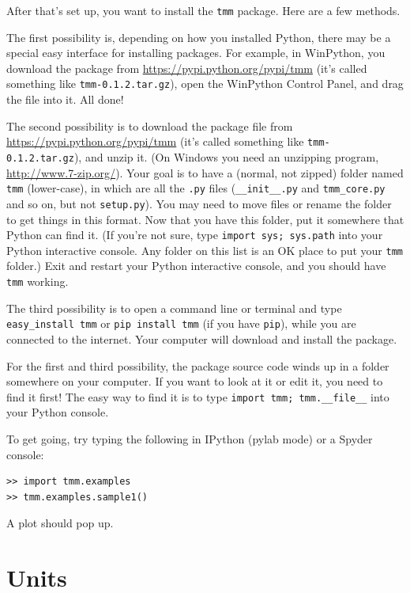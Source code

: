 \documentclass[12pt]{article}
\renewcommand{\(}{\left(}
\renewcommand{\)}{\right)}
\begin{document}
After that's set up, you want to install the \verb=tmm= package. Here are a few methods.

The first possibility is, depending on how you installed Python, there may be a special easy interface for installing packages. For example, in WinPython, you download the package from \url{https://pypi.python.org/pypi/tmm} (it's called something like \verb=tmm-0.1.2.tar.gz=), open the WinPython Control Panel, and drag the file into it. All done!

The second possibility is to download the package file from \url{https://pypi.python.org/pypi/tmm} (it's called something like \verb=tmm-0.1.2.tar.gz=), and unzip it. (On Windows you need an unzipping program, \url{http://www.7-zip.org/}). Your goal is to have a (normal, not zipped) folder named \verb=tmm= (lower-case), in which are all the \verb=.py= files (\verb=__init__.py= and \verb=tmm_core.py= and so on, but not \verb=setup.py=). You may need to move files or rename the folder to get things in this format. Now that you have this folder, put it somewhere that Python can find it. (If you're not sure, type \verb=import sys; sys.path= into your Python interactive console. Any folder on this list is an OK place to put your \verb=tmm= folder.) Exit and restart your Python interactive console, and you should have \verb=tmm= working.

The third possibility is to open a command line or terminal and type \verb=easy_install tmm= or \verb=pip install tmm= (if you have \verb=pip=), while you are connected to the internet. Your computer will download and install the package.

For the first and third possibility, the package source code winds up in a folder somewhere on your computer. If you want to look at it or edit it, you need to find it first! The easy way to find it is to type \verb=import tmm; tmm.__file__= into your Python console.

To get going, try typing the following in IPython (pylab mode) or a Spyder console:

\begin{verbatim}
>> import tmm.examples
>> tmm.examples.sample1()
\end{verbatim}

A plot should pop up.

\section{Units}
\end{document}
